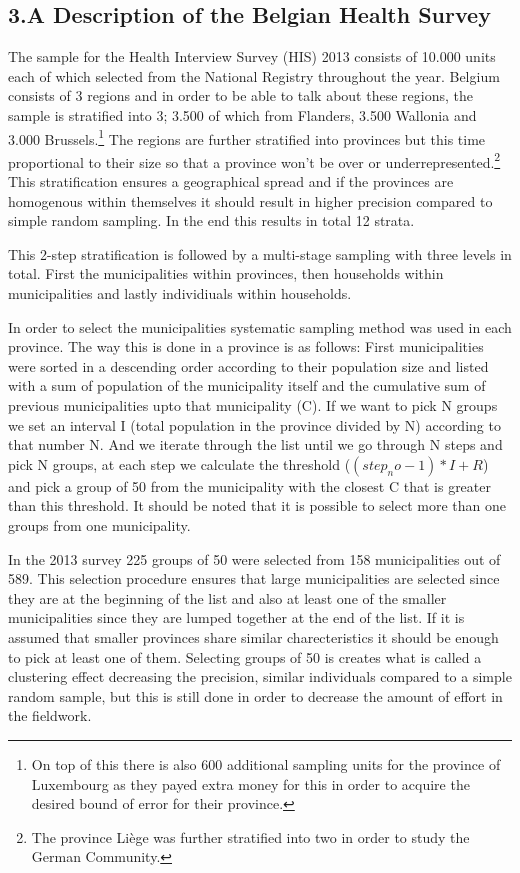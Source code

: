 \subsection*{3.A Description of the Belgian Health Survey}
The sample for the Health Interview Survey (HIS) 2013 consists of 10.000 units each of which selected from the National Registry throughout the year. Belgium consists of 3 regions and in order to be able to talk about these regions, the sample is stratified into 3; 3.500 of which from Flanders, 3.500 Wallonia and 3.000 Brussels.\footnote{On top of this there is also 600 additional sampling units for the province of Luxembourg as they payed extra money for this in order to acquire the desired bound of error for their province.} The regions are further stratified into provinces but this time proportional to their size so that a province won't be over or underrepresented.\footnote{The province Liège was further stratified into two in order to study the German Community.} This stratification ensures a geographical spread and if the provinces are homogenous within themselves it should result in higher precision compared to simple random sampling. In the end this results in total 12 strata.

This 2-step stratification is followed by a multi-stage sampling with three levels in total. First the municipalities within provinces, then households within municipalities and lastly individiuals within households. 

In order to select the municipalities systematic sampling method was used in each province. The way this is done in a province is as follows: First municipalities were sorted in a descending order according to their population size and listed with a sum of population of the municipality itself and the cumulative sum of previous municipalities upto that municipality (C). If we want to pick N groups we set an interval I (total population in the province divided by N) according to that number N. And we iterate through the list until we go through N steps and pick N groups, at each step we calculate the threshold ($(step_no-1)*I + R$) and pick a group of 50 from the municipality with the closest C that is greater than this threshold. It should be noted that it is possible to select more than one groups from one municipality.

In the 2013 survey 225 groups of 50 were selected from 158 municipalities out of 589. This selection procedure ensures that large municipalities are selected since they are at the beginning of the list and also at least one of the smaller municipalities since they are lumped together at the end of the list. If it is assumed that smaller provinces share similar charecteristics it should be enough to pick at least one of them. Selecting groups of 50 is creates what is called a clustering effect decreasing the precision, similar individuals compared to a simple random sample, but this is still done in order to decrease the amount of effort in the fieldwork.

